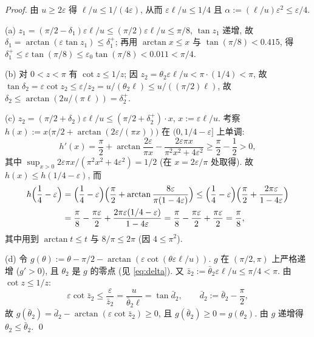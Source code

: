 \documentclass[UTF8]{ctexart}
\begin{document}
\begin{proof}
由 $u\ge2\varepsilon$ 得 $\ell/u\le1/(4\varepsilon)$, 从而
$\varepsilon\ell/u\le1/4$ 且 $\alpha:=(\ell/u)\varepsilon^2\le\varepsilon/4$.

(a) $z_1=(\pi/2-\delta_1)\varepsilon\ell/u\le(\pi/2)\varepsilon\ell/u\le\pi/8$,
$\tan z_1$ 递增, 故 $\delta_1=\arctan(\varepsilon\tan z_1)\le\delta_1^+$;
再用 $\arctan x\le x$ 与 $\tan(\pi/8)<0.415$, 得
$\delta_1^+\le\varepsilon\tan(\pi/8)\le\varepsilon_0\tan(\pi/8)<0.011<\pi/4$.

(b) 对 $0<z<\pi$ 有 $\cot z\le1/z$; 因 $z_2=\theta_2\varepsilon\ell/u<\pi\cdot(1/4)<\pi$, 故
$\tan\delta_2=\varepsilon\cot z_2\le\varepsilon/z_2=u/(\theta_2\ell)\le u/((\pi/2)\ell)$,
故 $\delta_2\le\arctan(2u/(\pi\ell))=\delta_2^+$.

(c) $z_2=(\pi/2+\delta_2)\varepsilon\ell/u\le(\pi/2+\delta_2^+)\cdot x$, $x:=\varepsilon\ell/u$.
考察 $h(x):=x\bigl(\pi/2+\arctan(2\varepsilon/(\pi x))\bigr)$ 在 $(0,1/4-\varepsilon]$ 上单调:
\begin{equation}
	h'(x)=\frac\pi2+\arctan\frac{2\varepsilon}{\pi x}-\frac{2\varepsilon\pi x}{\pi^2x^2+4\varepsilon^2}
	\ge\frac\pi2-\frac12>0,
\end{equation}
其中 $\sup_{x>0}2\varepsilon\pi x/(\pi^2x^2+4\varepsilon^2)=1/2$ (在 $x=2\varepsilon/\pi$ 处取得).
故 $h(x)\le h(1/4-\varepsilon)$, 而
\begin{align}
	h\Bigl(\frac14-\varepsilon\Bigr)
	&=\Bigl(\frac14-\varepsilon\Bigr)
	\Bigl(\frac\pi2+\arctan\frac{8\varepsilon}{\pi(1-4\varepsilon)}\Bigr)
	\le\Bigl(\frac14-\varepsilon\Bigr)
	\Bigl(\frac\pi2+\frac{2\pi\varepsilon}{1-4\varepsilon}\Bigr)\notag\\
	&=\frac\pi8-\frac{\pi\varepsilon}{2}
	+\frac{2\pi\varepsilon(1/4-\varepsilon)}{1-4\varepsilon}
	=\frac\pi8-\frac{\pi\varepsilon}{2}+\frac{\pi\varepsilon}{2}
	=\frac\pi8,
\end{align}
其中用到 $\arctan t\le t$ 与 $8/\pi\le2\pi$ (因 $4\le\pi^2$).

(d) 令 $g(\theta):=\theta-\pi/2-\arctan(\varepsilon\cot(\theta\varepsilon\ell/u))$.
$g$ 在 $(\pi/2,\pi)$ 上严格递增 ($g'>0$), 且 $\theta_2$ 是 $g$ 的零点 (见 \eqref{eq:delta}).
又 $\bar z_2:=\bar\theta_2\varepsilon\ell/u\le\pi/4<\pi$. 由 $\cot z\le1/z$:
\begin{equation}
	\varepsilon\cot\bar z_2\le\frac{\varepsilon}{\bar z_2}
	=\frac{u}{\bar\theta_2\ell}=\tan\bar d_2,\qquad \bar d_2:=\bar\theta_2-\frac\pi2,
\end{equation}
故 $g(\bar\theta_2)=\bar d_2-\arctan(\varepsilon\cot\bar z_2)\ge0$, 且 $g(\bar\theta_2)\ge0=g(\theta_2)$.
由 $g$ 递增得 $\theta_2\le\bar\theta_2$. \qed
\end{proof}
\end{document}
